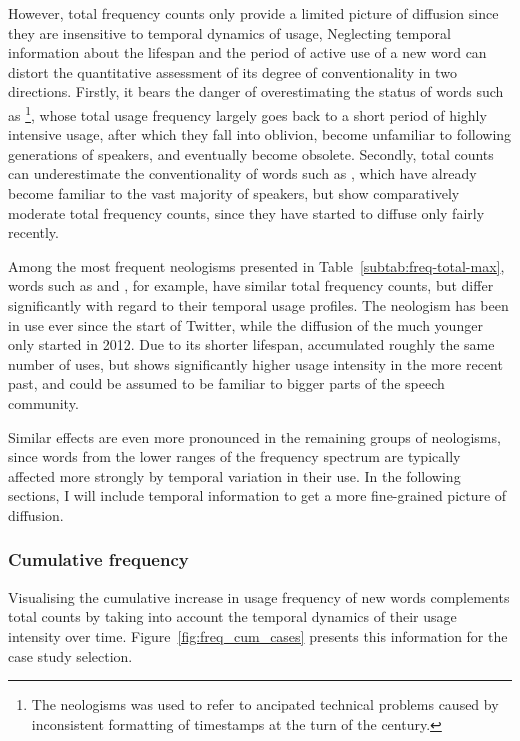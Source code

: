 \documentclass[
  a4paper,
  abstract=on,
  captions=tableabove
  ]{scrartcl}
\begin{document}
      However, total frequency counts only provide a limited picture of diffusion since they are insensitive to temporal dynamics of usage, Neglecting temporal information about the lifespan and the period of active use of a new word can distort the quantitative assessment of its degree of conventionality in two directions. Firstly, it bears the danger of overestimating the status of words such as \footnote{The neologisms  was used to refer to ancipated technical problems caused by inconsistent formatting of timestamps at the turn of the century.}, whose total usage frequency largely goes back to a short period of highly intensive usage, after which they fall into oblivion, become unfamiliar to following generations of speakers, and eventually become obsolete. Secondly, total counts can underestimate the conventionality of words such as , which have already become familiar to the vast majority of speakers, but show comparatively moderate total frequency counts, since they have started to diffuse only fairly recently.

      Among the most frequent neologisms presented in Table~\ref{subtab:freq-total-max}, words such as  and , for example, have similar total frequency counts, but differ significantly with regard to their temporal usage profiles. The neologism  has been in use ever since the start of Twitter, while the diffusion of the much younger  only started in 2012. Due to its shorter lifespan,  accumulated roughly the same number of uses, but shows significantly higher usage intensity in the more recent past, and could be assumed to be familiar to bigger parts of the speech community.

      Similar effects are even more pronounced in the remaining groups of neologisms, since words from the lower ranges of the frequency spectrum are typically affected more strongly by temporal variation in their use. In the following sections, I will include temporal information to get a more fine-grained picture of diffusion.


    \subsubsection{Cumulative frequency}

      Visualising the cumulative increase in usage frequency of new words complements total counts by taking into account the temporal dynamics of their usage intensity over time. Figure~\ref{fig:freq_cum_cases} presents this information for the case study selection.
\end{document}
